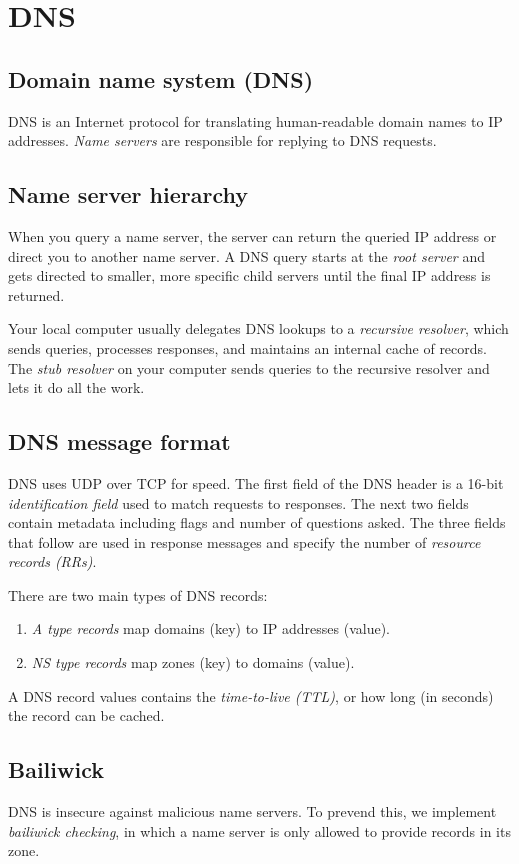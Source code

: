 \chapter{DNS}

\section{Domain name system (DNS)}
DNS is an Internet protocol for translating human-readable domain names to IP addresses. \emph{Name servers} are responsible for replying to DNS requests. 

\section{Name server hierarchy}
When you query a name server, the server can return the queried IP address or direct you to another name server. A DNS query starts at the \emph{root server} and gets directed to smaller, more specific child servers until the final IP address is returned.

\medskip
Your local computer usually delegates DNS lookups to a \emph{recursive resolver}, which sends queries, processes responses, and maintains an internal cache of records. The \emph{stub resolver} on your computer sends queries to the recursive resolver and lets it do all the work.

\section{DNS message format}
DNS uses UDP over TCP for speed. The first field of the DNS header is a 16-bit \emph{identification field} used to match requests to responses. The next two fields contain metadata including flags and number of questions asked. The three fields that follow are used in response messages and specify the number of \emph{resource records (RRs)}.

\medskip
There are two main types of DNS records:
\begin{enumerate}
    \item \emph{A type records} map domains (key) to IP addresses (value).
    \item \emph{NS type records} map zones (key) to domains (value).
\end{enumerate}

A DNS record values contains the \emph{time-to-live (TTL)}, or how long (in seconds) the record can be cached.

\section{Bailiwick}
DNS is insecure against malicious name servers. To prevend this, we implement \emph{bailiwick checking}, in which a name server is only allowed to provide records in its zone.

